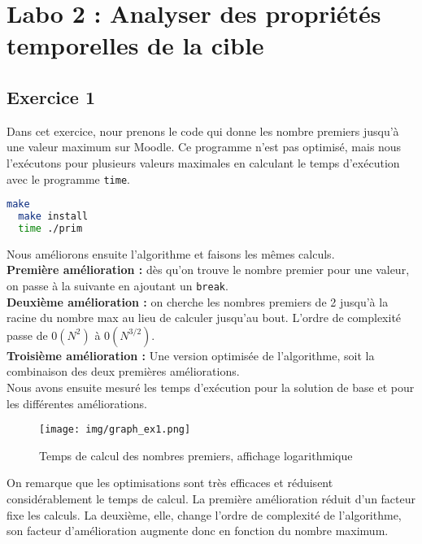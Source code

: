 \chapter{Labo 2 : Analyser des propriétés temporelles de la cible}


\section{Exercice 1}

Dans cet exercice, nour prenons le code qui donne les nombre premiers jusqu'à une valeur maximum sur Moodle. Ce programme n'est pas optimisé, mais nous l'exécutons pour plusieurs valeurs maximales en calculant le temps d'exécution avec le programme \texttt{time}.


\begin{lstlisting}[language=bash]
  make
  make install
  time ./prim
\end{lstlisting}

Nous améliorons ensuite l'algorithme et faisons les mêmes calculs. \\ 

\textbf{Première amélioration :} dès qu'on trouve le nombre premier pour une valeur, on passe à la suivante en ajoutant un \texttt{break}. \\

\textbf{Deuxième amélioration :} on cherche les nombres premiers de 2 jusqu'à la racine du nombre max au lieu de calculer jusqu'au bout. L'ordre de complexité passe de $0(N^2)$ à $0(N^{3/2})$. \\

\textbf{Troisième amélioration :} Une version optimisée de l'algorithme, soit la combinaison des deux premières améliorations. \\

Nous avons ensuite mesuré les temps d'exécution pour la solution de base et pour les différentes améliorations. 

\newpage

\begin{figure}[h]
  \centering
    \texttt{[image: img/graph\_ex1.png]}
  \caption{Temps de calcul des nombres premiers, affichage logarithmique}
  \label{graph1}
\end{figure}

On remarque que les optimisations sont très efficaces et réduisent considérablement le temps de calcul. La première amélioration réduit d'un facteur fixe les calculs. La deuxième, elle, change l'ordre de complexité de l'algorithme, son facteur d'amélioration augmente donc en fonction du nombre maximum. \\

